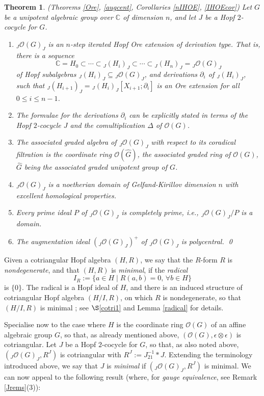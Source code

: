 \documentclass{amsart}
\numberwithin{equation}{section}
\newtheorem{theorem}{Theorem}[section]
\theoremstyle{definition}
\begin{document}
\begin{theorem}\label{structureintro}{\rm (Theorems \ref{Ore}, \ref{augcent}, Corollaries \ref{nIHOE}, \ref{IHOEcor})} Let $G$ be a unipotent algebraic group over $\mathbb{C}$ of dimension $n$, and let $J$ be a Hopf $2$-cocycle for $G$.
\begin{enumerate}
\item $_J\mathcal{O}(G)_J$ is an $n$-step iterated Hopf Ore extension of derivation type. That is, there is a sequence 
$$ \mathbb{C} = H_0 \subset \cdots \subset {}_J(H_i)_J \subset \cdots \subset {}_J(H_n)_J ={}_J\mathcal{O}(G)_J $$
of Hopf subalgebras ${}_J(H_i)_J\subseteq {}_J\mathcal{O}(G)_J$, and derivations $\partial_i$ of ${}_J(H_i)_J$, such that ${}_J(H_{i+1})_J = {}_J(H_{i})_J[X_{i+1} ; \partial_i]$ is an Ore extension for all $0\le i \le n-1$. 
\item The formulae for the derivations $\partial_i$ can be explicitly stated in terms of the Hopf $2$-cocycle $J$ and the comultiplication $\Delta$ of $\mathcal{O}(G)$.
\item The associated graded algebra of ${}_J\mathcal{O}(G)_J$ with respect to its coradical filtration is the coordinate ring $\mathcal{O}(\widehat{G})$, the associated graded ring of $\mathcal{O}(G)$, $\widehat{G}$ being the associated graded unipotent group of $G$.
\item ${}_J\mathcal{O}(G)_J$ is a noetherian domain of Gelfand-Kirillov dimension $n$ with excellent homological properties.
\item Every prime ideal $P$ of ${}_J\mathcal{O}(G)_J$ is completely prime, i.e., ${}_J\mathcal{O}(G)_J/P$ is a domain.
\item The augmentation ideal $({}_J\mathcal{O}(G)_J)^+$ of ${}_J\mathcal{O}(G)_J$ is polycentral. \qed
\end{enumerate}
\end{theorem}

Given a cotriangular Hopf algebra $(H,R)$, we say that the $R$-form $R$ is \emph{nondegenerate}, and that $(H,R)$ is \emph{minimal}, if the \emph{radical} $$I_R := \{a \in H \mid R(a,b) = 0, \, \forall b \in H \}$$ is $\{0\}$. The radical is a Hopf ideal of $H$, and there is an induced structure of cotriangular Hopf algebra $(H/I,R)$, on which $R$ is nondegenerate, so that $(H/I,R)$ is minimal \cite[\S 2.2]{G1}; see $\S$\ref{cotri1} and Lemma \ref{radical} for details.
 
Specialise now to the case where $H$ is the coordinate ring $\mathcal{O}(G)$ of an affine algebraic group $G$, so that, as already mentioned above, $(\mathcal{O}(G),\epsilon \otimes \epsilon)$ is cotriangular. Let $J$ be a Hopf $2$-cocycle for $G$, so that, as also noted above, $({}_J\mathcal{O}(G)_J,R^J)$ is cotriangular with $R^J := J_{21}^{-1}\ast J$. Extending the terminology introduced above, we say that $J$ is \emph{minimal} if $({}_J\mathcal{O}(G)_J, R^J)$ is minimal. We can now appeal to the following result (where, for \emph{gauge equivalence}, see Remark \ref{Jrems}(3)): 
\end{document}
